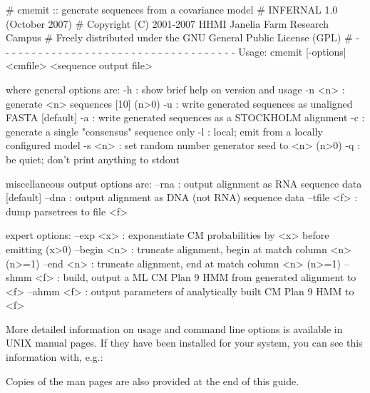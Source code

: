 \begin{sreoutput}
# cmemit :: generate sequences from a covariance model
# INFERNAL 1.0 (October 2007)
# Copyright (C) 2001-2007 HHMI Janelia Farm Research Campus
# Freely distributed under the GNU General Public License (GPL)
# - - - - - - - - - - - - - - - - - - - - - - - - - - - - - - - - - - - -
Usage: cmemit [-options] <cmfile> <sequence output file>

where general options are:
  -h           : show brief help on version and usage
  -n <n>       : generate <n> sequences  [10]  (n>0)
  -u           : write generated sequences as unaligned FASTA  [default]
  -a           : write generated sequences as a STOCKHOLM alignment
  -c           : generate a single "consensus" sequence only
  -l           : local; emit from a locally configured model
  -s <n>       : set random number generator seed to <n>  (n>0)
  -q           : be quiet; don't print anything to stdout

miscellaneous output options are:
  --rna       : output alignment as RNA sequence data  [default]
  --dna       : output alignment as DNA (not RNA) sequence data
  --tfile <f> : dump parsetrees to file <f>

expert options:
  --exp <x>   : exponentiate CM probabilities by <x> before emitting  (x>0)
  --begin <n> : truncate alignment, begin at match column <n>  (n>=1)
  --end <n>   : truncate alignment,   end at match column <n>  (n>=1)
  --shmm <f>  : build, output a ML CM Plan 9 HMM from generated alignment to <f>
  --ahmm <f>  : output parameters of analytically built CM Plan 9 HMM to <f>
\end{sreoutput}

More detailed information on usage and command line options is
available in UNIX manual pages. If they have been installed for your
system, you can see this information with, e.g.:


Copies of the man pages are also provided at the end of this guide.

